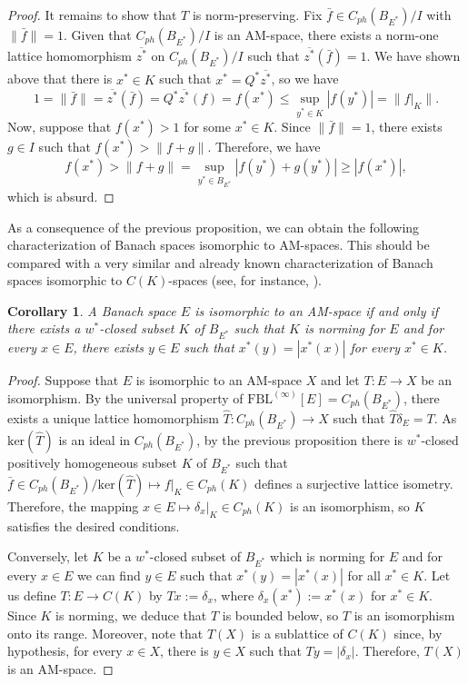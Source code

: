 \documentclass[11pt]{amsart}
\newtheorem{cor}[thm]{Corollary}
\theoremstyle{definition}
\numberwithin{equation}{section}
\newcommand{\fbl}{\text{FBL}}
\begin{document}
\begin{proof}
It remains to show that $T$ is norm-preserving. Fix $\bar{f}\in C_{ph}(B_{E^*})/I$ with $\|\bar{f}\|=1$. Given that $C_{ph}(B_{E^*})/I$ is an AM-space, there exists a norm-one lattice homomorphism $\overline{z^*}$ on $C_{ph}(B_{E^*})/I$ such that $\overline{z^*}(\bar{f})=1$. We have shown above that there is $x^*\in K$ such that $\widehat{x^*}=Q^*\overline{z^*}$, so we have
$$
1=\|\bar{f}\|=\overline{z^*}(\bar{f})=Q^*\overline{z^*}(f)=f(x^*)\leq \sup_{y^*\in K} |f(y^*)|=\|\left.f\right|_K\|.
$$
Now, suppose that $f(x^*)>1$ for some $x^*\in K$. Since $\|\bar{f}\|=1$, there exists $g\in I$ such that $f(x^*)>\|f+g\|$. Therefore, we have
$$
f(x^*)>\|f+g\|=\sup_{y^*\in B_{E^*}} |f(y^*)+g(y^*)|\geq |f(x^*)|,
$$
which is absurd.
\end{proof}

As a consequence of the previous proposition, we can obtain the following characterization of Banach spaces isomorphic to AM-spaces. This should be compared with a very similar and already known characterization of Banach spaces isomorphic to $C(K)$-spaces (see, for instance, \cite[Lemma 2.2]{PS1}).

\begin{cor}
A Banach space $E$ is isomorphic to an AM-space if and only if there exists a $w^*$-closed subset $K$ of $B_{E^*}$ such that $K$ is norming for $E$ and for every $x\in E$, there exists $y\in E$ such that $x^*(y)=|x^*(x)|$ for every $x^*\in K$. 
\end{cor}
\begin{proof}
Suppose that $E$ is isomorphic to an AM-space $X$ and let $T:E\to X$ be an isomorphism. By the universal property of $\fbl^{(\infty)}[E]=C_{ph}(B_{E^*})$, there exists a unique lattice homomorphism $\widehat{T}:C_{ph}(B_{E^*})\to X$ such that $\widehat{T}\delta_E=T$. As $\text{ker}(\widehat{T})$ is an ideal in $C_{ph}(B_{E^*})$, by the previous proposition there is $w^*$-closed positively homogeneous subset $K$ of $B_{E^*}$ such that $\bar{f}\in C_{ph}(B_{E^*})/\text{ker}(\widehat{T})\mapsto \left.f\right|_K\in C_{ph}(K)$ defines a surjective lattice isometry. Therefore, the mapping $x\in E\mapsto \left.\delta_x\right|_K\in C_{ph}(K)$ is an isomorphism, so $K$ satisfies the desired conditions.

Conversely, let $K$ be a $w^*$-closed subset of $B_{E^*}$ which is norming for $E$ and for every $x\in E$ we can find $y\in E$ such that $x^*(y)=|x^*(x)|$ for all $x^*\in K$. Let us define $T:E\to C(K)$ by $Tx:=\delta_x$, where $\delta_x(x^*):=x^*(x)$ for $x^*\in K$. Since $K$ is norming, we deduce that $T$ is bounded below, so $T$ is an isomorphism onto its range. Moreover, note that $T(X)$ is a sublattice of $C(K)$ since, by hypothesis, for every $x\in X$, there is $y\in X$ such that $Ty=|\delta_x|$. Therefore, $T(X)$ is an AM-space.
\end{proof}
\end{document}
